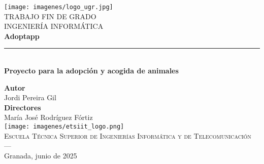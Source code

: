 \documentclass{article}
\renewcommand\maketitle{} %
\begin{document}
	\begin{titlepage}
		
		
		\newlength{\centeroffset}
		\setlength{\centeroffset}{-0.5\oddsidemargin}
		\addtolength{\centeroffset}{0.5\evensidemargin}
		\thispagestyle{empty}
		
		\noindent\hspace*{\centeroffset}\begin{minipage}{\textwidth}
			
			\centering
			\texttt{[image: imagenes/logo\_ugr.jpg]}\\[1.4cm]
			
			\textsc{ \Large TRABAJO FIN DE GRADO\\[0.2cm]}
			\textsc{ INGENIERÍA INFORMÁTICA}\\[1cm]
			{\Huge\bfseries Adoptapp\\
			}
			\noindent\rule[-1ex]{\textwidth}{3pt}\\[3.5ex]
			{\large\bfseries Proyecto para la adopción y acogida de animales}
		\end{minipage}
		
		\vspace{2.5cm}
		\noindent\hspace*{\centeroffset}\begin{minipage}{\textwidth}
			\centering
			
			\textbf{Autor}\\ {Jordi Pereira Gil}\\[2.5ex]
			\textbf{Directores}\\
			{María José Rodríguez Fórtiz}\\[2cm]
			\texttt{[image: imagenes/etsiit\_logo.png]}\\[0.1cm]
			\textsc{Escuela Técnica Superior de Ingenierías Informática y de Telecomunicación}\\
			\textsc{---}\\
			Granada, junio de 2025
		\end{minipage}
	\end{titlepage}
	
	
	

\maketitle








\end{document}
